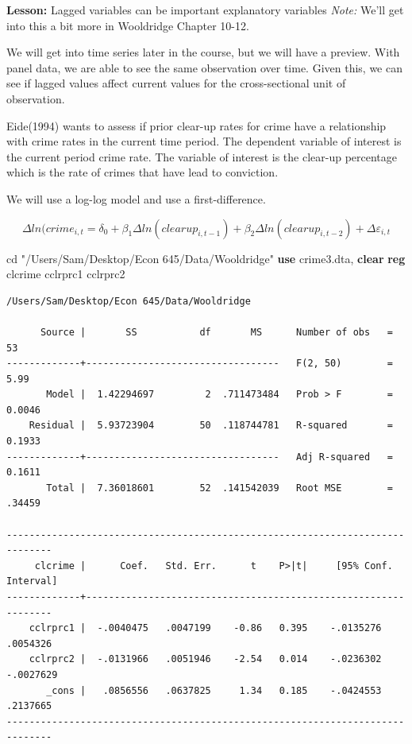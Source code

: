 \documentclass[
]{book}
\newenvironment{Shaded}{\begin{snugshade}}{\end{snugshade}}
\newcommand{\KeywordTok}[1]{\textcolor[rgb]{0.13,0.29,0.53}{\textbf{#1}}}
\newcommand{\NormalTok}[1]{#1}
\newcommand{\StringTok}[1]{\textcolor[rgb]{0.31,0.60,0.02}{#1}}
\begin{document}
\textbf{Lesson:} Lagged variables can be important explanatory variables
\emph{Note:} We'll get into this a bit more in Wooldridge Chapter 10-12.

We will get into time series later in the course, but we will have a preview. With panel data, we are able to see the same observation over time. Given this, we can see if lagged values affect current values for the cross-sectional unit of observation.

Eide(1994) wants to assess if prior clear-up rates for crime have a relationship with crime rates in the current time period. The dependent variable of interest is the current period crime rate. The variable of interest is the clear-up percentage which is the rate of crimes that have lead to conviction.

We will use a log-log model and use a first-difference.

\[ \Delta ln(crime_{i,t}= \delta_0 + \beta_1 \Delta ln(clearup_{i,t-1}) + \beta_2 \Delta ln(clearup_{i,t-2}) + \Delta \varepsilon_{i,t} \]

\begin{Shaded}
\begin{Highlighting}[]
\NormalTok{cd }\StringTok{"/Users/Sam/Desktop/Econ 645/Data/Wooldridge"}
\KeywordTok{use}\NormalTok{ crime3.dta, }\KeywordTok{clear}
\KeywordTok{reg}\NormalTok{ clcrime cclrprc1 cclrprc2}
\end{Highlighting}
\end{Shaded}

\begin{verbatim}
/Users/Sam/Desktop/Econ 645/Data/Wooldridge

      Source |       SS           df       MS      Number of obs   =        53
-------------+----------------------------------   F(2, 50)        =      5.99
       Model |  1.42294697         2  .711473484   Prob > F        =    0.0046
    Residual |  5.93723904        50  .118744781   R-squared       =    0.1933
-------------+----------------------------------   Adj R-squared   =    0.1611
       Total |  7.36018601        52  .141542039   Root MSE        =    .34459

------------------------------------------------------------------------------
     clcrime |      Coef.   Std. Err.      t    P>|t|     [95% Conf. Interval]
-------------+----------------------------------------------------------------
    cclrprc1 |  -.0040475   .0047199    -0.86   0.395    -.0135276    .0054326
    cclrprc2 |  -.0131966   .0051946    -2.54   0.014    -.0236302   -.0027629
       _cons |   .0856556   .0637825     1.34   0.185    -.0424553    .2137665
------------------------------------------------------------------------------
\end{verbatim}
\end{document}
